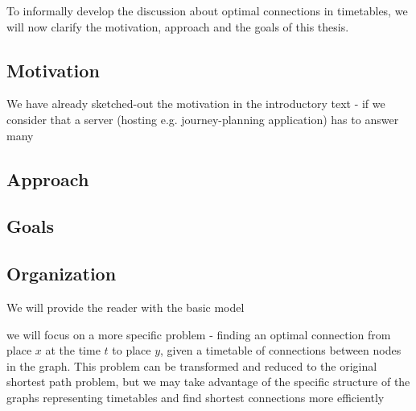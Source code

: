 \noindent To informally develop the discussion about optimal connections in timetables, we will now clarify the motivation, approach and the goals of this thesis.

\subsection{Motivation}

	\noindent We have already sketched-out the motivation in the introductory text - if we consider that a server (hosting e.g. journey-planning application) has to answer many 
	
\subsection{Approach}

	\noindent 
	
\subsection{Goals}
	
\subsection{Organization}
We will provide the reader with the basic model 

we will focus on a more specific problem - finding an optimal connection from place $x$ at the time $t$ to place $y$, given a timetable of connections between nodes in the graph. This problem can be transformed and reduced to the original shortest path problem, but we may take advantage of the specific structure of the graphs representing timetables and find shortest connections more efficiently